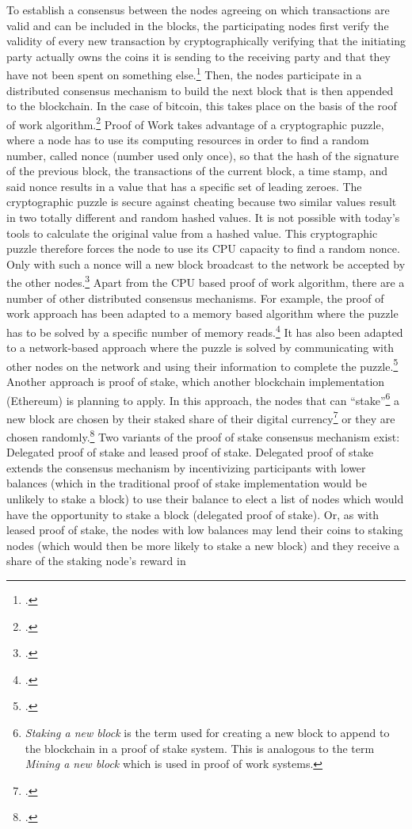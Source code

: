 To establish a consensus between the nodes agreeing on which transactions are valid and can be included in the blocks, the participating nodes first verify the validity of every new transaction by cryptographically verifying that the initiating party actually owns the coins it is sending to the receiving party and that they have not been spent on something else.\footcite[cf.][p.68]{AntonopolousAndreasM..2017} Then, the nodes participate in a distributed consensus mechanism to build the next block that is then appended to the blockchain. In the case of bitcoin, this takes place on the basis of the roof of work algorithm.\footcites[Cf.][]{Dwork.1993}[cf.][p.3]{Nakamoto.2008} Proof of Work takes advantage of a cryptographic puzzle, where a node has to use its computing resources in order to find a random number, called nonce (number used only once), so that the hash of the signature of the previous block, the transactions of the current block, a time stamp, and said nonce results in a value that has a specific set of leading zeroes. The cryptographic puzzle is secure against cheating because two similar values result in two totally different and random hashed values. It is not possible with today's tools to calculate the original value from a hashed value. This cryptographic puzzle therefore forces the node to use its CPU capacity to find a random nonce. Only with such a nonce will a new block broadcast to the network be accepted by the other nodes.\footcites[Cf.][p.8]{Nakamoto.2008}[cf.][p.12]{Schutte.2017} Apart from the CPU based proof of work algorithm, there are a number of other distributed consensus mechanisms. For example, the proof of work approach has been adapted to a memory based algorithm where the puzzle has to be solved by a specific number of memory reads.\footcite[Cf.][]{Abadi.2005} It has also been adapted to a network-based approach where the puzzle is solved by communicating with other nodes on the network and using their information to complete the puzzle.\footcite[Cf.][]{Abliz.2009} Another approach is proof of stake, which another blockchain implementation (Ethereum) is planning to apply. In this approach, the nodes that can \enquote{stake}\footnote{\textit{Staking a  new block} is the term used for creating a new block to append to the blockchain in a proof of stake system. This is analogous to the term \textit{Mining a new block} which is used in proof of work systems.} a new block are chosen by their staked share of their digital currency\footcite[Cf.][]{King.2012} or they are chosen randomly.\footcites[Cf.][]{w.A..2016}[cf.][p.200]{AntonopolousAndreasM..2017}[cf.][p.11-12]{Schlatt.2016} Two variants of the proof of stake consensus mechanism exist: Delegated proof of stake and leased proof of stake. Delegated proof of stake extends the consensus mechanism by incentivizing participants with lower balances (which in the traditional proof of stake implementation would be unlikely to stake a block) to use their balance to elect a list of nodes which would have the opportunity to stake a block (delegated proof of stake). Or, as with leased proof of stake, the nodes with low balances may lend their coins to staking nodes (which would then be more likely to stake a new block) and they receive a share of the staking node's reward in 